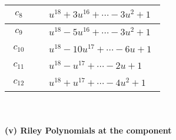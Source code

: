 \documentclass[1p]{elsarticle_modified}
\theoremstyle{definition}
\begin{document}
\begin{tabular}{m{50pt}|m{274pt}}
\hline $$\begin{aligned}c_{8}\end{aligned}$$&$\begin{aligned}
&u^{18}+3 u^{16}+\cdots-3 u^2+1
\end{aligned}$\\
\hline $$\begin{aligned}c_{9}\end{aligned}$$&$\begin{aligned}
&u^{18}-5 u^{16}+\cdots-3 u^2+1
\end{aligned}$\\
\hline $$\begin{aligned}c_{10}\end{aligned}$$&$\begin{aligned}
&u^{18}-10 u^{17}+\cdots-6 u+1
\end{aligned}$\\
\hline $$\begin{aligned}c_{11}\end{aligned}$$&$\begin{aligned}
&u^{18}- u^{17}+\cdots-2 u+1
\end{aligned}$\\
\hline $$\begin{aligned}c_{12}\end{aligned}$$&$\begin{aligned}
&u^{18}+u^{17}+\cdots-4 u^2+1
\end{aligned}$\\
\hline
\end{tabular}\\~\\
\newpage\renewcommand{\arraystretch}{1}
\flushleft \textbf{(v) Riley Polynomials at the component}\newline \\
\end{document}
